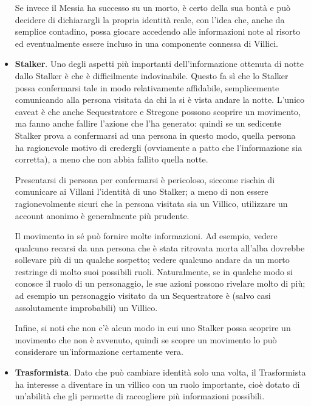 \documentclass[a4paper,10pt]{article}
\begin{document}
\begin{itemize}
	Se invece il Messia ha successo su un morto, è certo della sua bontà e può decidere di dichiarargli la propria identità reale, con l’idea che, anche da semplice contadino, possa giocare accedendo alle informazioni note al risorto ed eventualmente essere incluso in una componente connessa di Villici.
	
	\item {\bf Stalker}. Uno degli aspetti più importanti dell'informazione ottenuta di notte dallo Stalker è che è difficilmente indovinabile. Questo fa sì che lo Stalker possa confermarsi tale in modo relativamente affidabile, semplicemente comunicando alla persona visitata da chi la si è vista andare la notte. L'unico caveat è che anche Sequestratore e Stregone possono scoprire un movimento, ma fanno anche fallire l'azione che l'ha generato: quindi se un sedicente Stalker prova a confermarsi ad una persona in questo modo, quella persona ha ragionevole motivo di credergli (ovviamente a patto che l'informazione sia corretta), a meno che non abbia fallito quella notte.

    Presentarsi di persona per confermarsi è pericoloso, siccome rischia di comunicare ai Villani l'identità di uno Stalker; a meno di non essere ragionevolmente sicuri che la persona visitata sia un Villico, utilizzare un account anonimo è generalmente più prudente.

    Il movimento in sé può fornire molte informazioni. Ad esempio, vedere qualcuno recarsi da una persona che è stata ritrovata morta all'alba dovrebbe sollevare più di un qualche sospetto; vedere qualcuno andare da un morto restringe di molto suoi possibili ruoli. Naturalmente, se in qualche modo si conosce il ruolo di un personaggio, le sue azioni possono rivelare molto di più; ad esempio un personaggio visitato da un Sequestratore è (salvo casi assolutamente improbabili) un Villico.

    Infine, si noti che non c'è alcun modo in cui uno Stalker possa scoprire un movimento che non è avvenuto, quindi se scopre un movimento lo può considerare un'informazione certamente vera. %

	\item {\bf Trasformista}. Dato che può cambiare identità solo una volta, il Trasformista ha interesse a diventare in un villico con un ruolo importante, cioè dotato di un’abilità che gli permette di raccogliere più informazioni possibili.
    

\end{itemize}
\end{document}
